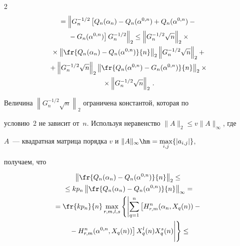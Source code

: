 \begin{multicols}{2}
\begin{multline}
{}=\left\|G^{-1/2}_n\left[Q_n(\alpha_n)-Q_n(\alpha^{0,n})+


Q_n(\alpha^{0,n})-{}\right.\right.\\


\left.\left.{}-G_n(\alpha^{0,n})\right]G^{-1/2}_n\right\|_2\leq


\left\|G^{-1/2}_n\sqrt{n}\right\|_2\times{}\\


{}\times\left\|\fr{Q_n(\alpha_n)-Q_n(\alpha^{0,n})}{n}\right\|_2 


\left\|G^{-1/2}_n\sqrt{n}\right\|_2+{}\\


{}+\left\|G^{-1/2}_n\sqrt{n}\right\|_2 \left\|\fr{Q_n(\alpha^{0,n})-


G_n(\alpha^{0,n})}{n}\right\|_2\times{}\\


{}\times\left\|G^{-1/2}_n\sqrt{n}\right\|_2\,.\label{eq14}


\end{multline}





Величина $\left\|G^{-1/2}_n\sqrt{n}\right\|_2$ ограничена константой, которая по 


условию~2 не зависит от~$n$. Используя неравенство $\|A\|_2\leq v\|A\|_{\infty}$, где 


$A$~--- квадратная матрица порядка $v$ и $\|A\|_{\infty}\hm= \max\limits_{i,j}\{|a_{i,j}|\}$, 


получаем, что


\begin{multline}


\left\|\fr{Q_n(\alpha_n)-Q_n(\alpha^{0,n})}{n}\right\|_2\leq{}\\


{}\leq kp_n\left\|


\fr{Q_n(\alpha_n)-Q_n(\alpha^{0,n})}{n}\right\|_{\infty}={}\\


{}=\fr{kp_n}{n}\max\limits_{r,m,l,s}\left\{\left|\sum\limits_{q=1}^n


\left[H^n_{r,m}(\alpha_n, X_q(n))-{}\right.\right.\right.\\


\left.\left.\left.{}-H^n_{r,m}(\alpha^{0,n}, X_q(n)) \right] 


X_q^l(n)X_q^s(n)\vphantom{\sum\limits_{q=1}^n}\right|\right\}\leq{}\\



\end{multline}
\end{multicols}
